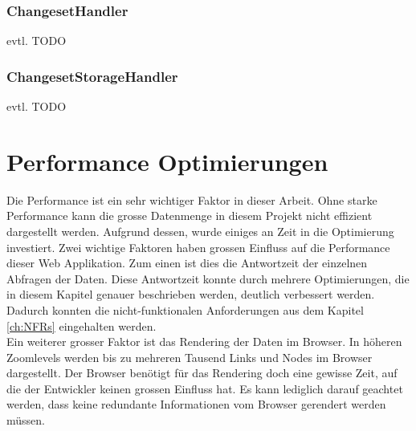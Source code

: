 \subsubsection{ChangesetHandler}
evtl. TODO
\subsubsection{ChangesetStorageHandler}
evtl. TODO
\section{Performance Optimierungen}
Die Performance ist ein sehr wichtiger Faktor in dieser Arbeit. Ohne starke Performance kann die grosse Datenmenge in diesem Projekt nicht effizient dargestellt werden. Aufgrund dessen, wurde einiges an Zeit in die Optimierung investiert. Zwei wichtige Faktoren haben grossen Einfluss auf die Performance dieser Web Applikation. Zum einen ist dies die Antwortzeit der einzelnen Abfragen der Daten. Diese Antwortzeit konnte durch mehrere Optimierungen, die in diesem Kapitel genauer beschrieben werden, deutlich verbessert werden. Dadurch konnten die nicht-funktionalen Anforderungen aus dem Kapitel \ref{ch:NFRs} eingehalten werden.\\
Ein weiterer grosser Faktor ist das Rendering der Daten im Browser. In höheren Zoomlevels werden bis zu mehreren Tausend Links und Nodes im Browser dargestellt. Der Browser benötigt für das Rendering doch eine gewisse Zeit, auf die der Entwickler keinen grossen Einfluss hat. Es kann lediglich darauf geachtet werden, dass keine redundante Informationen vom Browser gerendert werden müssen.
